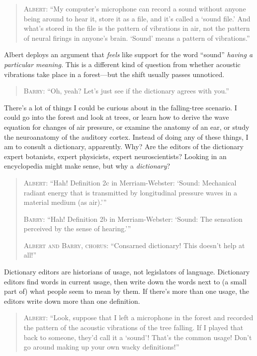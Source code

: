 {{\begin{quotation}
{
 \textsc{Albert}: ``My computer's
microphone can record a sound without anyone being around to hear it,
store it as a file, and it's called a
`sound file.' And what's
stored in the file is the pattern of vibrations in air, not the pattern
of neural firings in anyone's brain.
`Sound' means a pattern of
vibrations.''}
\end{quotation}

{
 Albert deploys an argument that \textit{feels} like support for
the word ``sound'' \textit{having a
particular meaning.} This is a different kind of question from whether
acoustic vibrations take place in a forest---but the shift usually
passes unnoticed.}

\begin{quotation}
{
 \textsc{Barry}: ``Oh, yeah? Let's just see
 if the dictionary agrees with you.''}
\end{quotation}

{
 There's a lot of things I could be curious about
in the falling-tree scenario. I could go into the forest and look at
trees, or learn how to derive the wave equation for changes of air
pressure, or examine the anatomy of an ear, or study the neuroanatomy
of the auditory cortex. Instead of doing any of these things, I am to
consult a dictionary, apparently. Why? Are the editors of the
dictionary expert botanists, expert physicists, expert neuroscientists?
Looking in an encyclopedia might make sense, but why a
\textit{dictionary}?}

\begin{quotation}
{
 \textsc{Albert}: ``Hah! Definition 2c in Merriam-Webster:
`Sound: Mechanical radiant energy that is transmitted by
longitudinal pressure waves in a material medium (as
air).'''}

{
 \textsc{Barry}: ``Hah! Definition 2b in Merriam-Webster:
`Sound: The sensation perceived by the sense of
hearing.'''}

{
 \textsc{Albert and Barry, chorus}: ``Consarned dictionary!
 This doesn't help at all!''}
\end{quotation}

{
 Dictionary editors are historians of usage, not legislators of
language. Dictionary editors find words in current usage, then write
down the words next to (a small part of) what people seem to mean by
them. If there's more than one usage, the editors write
down more than one definition.}

\begin{quotation}
{
 \textsc{Albert}: ``Look, suppose that I left a microphone
in the forest and recorded the pattern of the acoustic vibrations of
the tree falling. If I played that back to someone,
they'd call it a
`sound'! That's the
common usage! Don't go around making up your own wacky
definitions!''}


\end{quotation}}}
